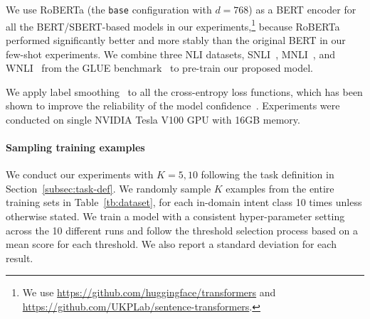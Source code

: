 We use RoBERTa (the {\tt base} configuration with $d=768$) as a BERT encoder for all the BERT/SBERT-based models in our experiments,\footnote{We use \url{https://github.com/huggingface/transformers} and \url{https://github.com/UKPLab/sentence-transformers}.}
because RoBERTa performed significantly better and more stably than the original BERT in our few-shot experiments.
We combine three NLI datasets, SNLI~\citep{snli}, MNLI~\citep{mnli}, and WNLI~\citep{wnli} from the GLUE benchmark~\citep{glue} to pre-train our proposed model.

We apply label smoothing~\citep{label_smoothing_orig} to all the cross-entropy loss functions, which has been shown to improve the reliability of the model confidence~\citep{label_smoothing}.
Experiments were conducted on single NVIDIA Tesla V100 GPU with 16GB memory.


\paragraph{Sampling training examples}
We conduct our experiments with $K=5, 10$ following the task definition in Section~\ref{subsec:task-def}.
We randomly sample $K$ examples from the entire training sets in Table~\ref{tb:dataset}, for each in-domain intent class 10 times unless otherwise stated.
We train a model with a consistent hyper-parameter setting across the 10 different runs and follow the threshold selection process based on a mean score for each threshold.
We also report a standard deviation for each result.

